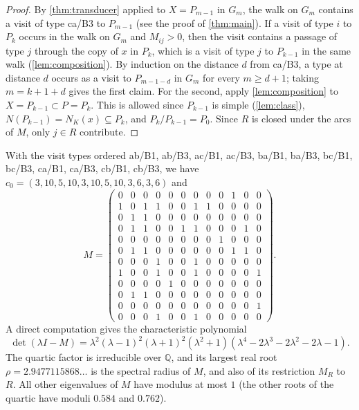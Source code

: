 \documentclass[11pt]{article}
\theoremstyle{definition}
\begin{document}
\begin{proof}
By \cref{thm:transducer} applied to $X = P_{m-1}$ in $G_m$, the walk on $G_m$ contains a visit of
type ca/B3 to $P_{m-1}$ (see the proof of \cref{thm:main}). If a visit of type $i$ to $P_k$ occurs
in the walk on $G_m$ and $M_{ij} > 0$, then the visit contains a passage of type $j$ through the
copy of $x$ in $P_k$, which is a visit of type $j$ to $P_{k-1}$ in the same walk
(\cref{lem:composition}). By induction on the distance $d$ from ca/B3, a type at distance $d$
occurs as a visit to $P_{m-1-d}$ in $G_m$ for every $m \ge d+1$; taking $m = k+1+d$ gives the
first claim. For the second, apply \cref{lem:composition} to $X = P_{k-1} \subset P = P_k$. This
is allowed since $P_{k-1}$ is simple (\cref{lem:class}), $N(P_{k-1}) = N_K(x) \subseteq P_k$, and
$P_k / P_{k-1} = P_0$. Since $R$ is closed under the arcs of $M$, only $j \in R$ contribute.
\end{proof}

With the visit types ordered ab/B1, ab/B3, ac/B1, ac/B3, ba/B1, ba/B3, bc/B1, bc/B3, ca/B1, ca/B3,
cb/B1, cb/B3, we have $c_0 = (3,10,5,10,3,10,5,10,3,6,3,6)$ and
\[
M = \begin{pmatrix}
0 & 0 & 0 & 0 & 0 & 0 & 0 & 0 & 0 & 1 & 0 & 0 \\
1 & 0 & 1 & 1 & 0 & 0 & 1 & 1 & 0 & 0 & 0 & 0 \\
0 & 1 & 1 & 0 & 0 & 0 & 0 & 0 & 0 & 0 & 0 & 0 \\
0 & 1 & 1 & 0 & 0 & 1 & 1 & 0 & 0 & 0 & 1 & 0 \\
0 & 0 & 0 & 0 & 0 & 0 & 0 & 0 & 1 & 0 & 0 & 0 \\
0 & 1 & 1 & 0 & 0 & 0 & 0 & 0 & 0 & 1 & 1 & 0 \\
0 & 0 & 0 & 1 & 0 & 0 & 1 & 0 & 0 & 0 & 0 & 0 \\
1 & 0 & 0 & 1 & 0 & 0 & 1 & 0 & 0 & 0 & 0 & 1 \\
0 & 0 & 0 & 0 & 1 & 0 & 0 & 0 & 0 & 0 & 0 & 0 \\
0 & 1 & 1 & 0 & 0 & 0 & 0 & 0 & 0 & 0 & 0 & 0 \\
0 & 0 & 0 & 0 & 0 & 0 & 0 & 0 & 0 & 0 & 0 & 1 \\
0 & 0 & 0 & 1 & 0 & 0 & 1 & 0 & 0 & 0 & 0 & 0
\end{pmatrix}.
\]
A direct computation gives the characteristic polynomial
\[
\det(\lambda I - M) = \lambda^2(\lambda-1)^2(\lambda+1)^2(\lambda^2+1)(\lambda^4 - 2\lambda^3 - 2\lambda^2 - 2\lambda - 1).
\]
The quartic factor is irreducible over $\mathbb{Q}$, and its largest real root
$\rho = 2.9477115868\ldots$ is the spectral radius of $M$, and also of its restriction $M_R$ to
$R$. All other eigenvalues of $M$ have modulus at most $1$ (the other roots of the quartic have
moduli $0.584$ and $0.762$).
\end{document}
